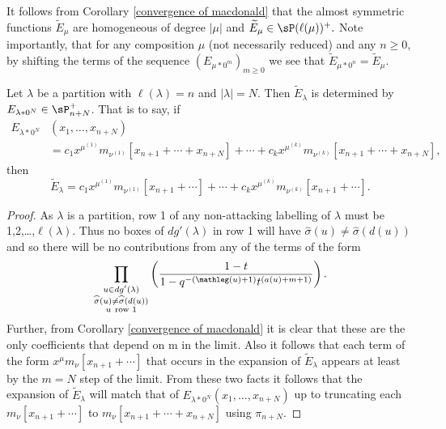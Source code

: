 It follows from Corollary \ref{convergence of macdonald} that the almost symmetric functions $\widetilde{E}_{\mu}$ are homogeneous of degree $|\mu|$ and $\widetilde{E}_{\mu} \in \sP(\ell(\mu))^{+}.$ Note importantly, that for any composition $\mu$ (not necessarily reduced) and any $n \geq 0$, by shifting the terms of the sequence $(E_{\mu*0^m})_{m\geq 0}$ we see that $\widetilde{E}_{\mu *0^n} = \widetilde{E}_{\mu}$.



\begin{coro}\label{stabilizing of convergence of macdonald for partitions}
Let $\lambda$ be a partition with $\ell(\lambda) = n$ and $|\lambda| = N$. Then $\widetilde{E}_{\lambda}$ is determined by  $E_{\lambda*0^N} \in \sP_{n+N}^{+}$. That is to say, if 
\begin{align*}
E_{\lambda*0^{N}}&(x_1,\ldots,x_{n+N}) \\ &= c_1 x^{\mu^{(1)}}m_{\nu^{(1)}}[x_{n+1}+\cdots+x_{n+N}] + \cdots + c_k x^{\mu^{(k)}}m_{\nu^{(k)}}[x_{n+1}+ \cdots +x_{n+N}],
\end{align*}
then 
$$ \widetilde{E}_{\lambda} = c_1 x^{\mu^{(1)}}m_{\nu^{(1)}}[x_{n+1}+ \cdots] + \cdots + c_k x^{\mu^{(k)}}m_{\nu^{(k)}}[x_{n+1}+ \cdots] .$$
\end{coro}

\begin{proof}
As $\lambda$ is a partition, row 1 of any non-attacking labelling of $\lambda$ must be 1,2,\ldots,$\ell(\lambda)$. Thus no boxes of $dg'(\lambda)$ in row 1 will have $\widehat{\sigma}(u) \neq \widehat{\sigma}(d(u))$ and so there will be no contributions from any of the terms of the form 
$$\prod_{\substack{ u \in dg'(\lambda) \\ \widehat{\sigma}(u) \neq \widehat{\sigma}(d(u)) \\ u ~ \text{row } 1 }} \left( \frac{1-t}{1-q^{-(\mathleg(u) +1)}t^{(a(u) + m + 1)}} \right).$$ Further, from  Corollary \ref{convergence of macdonald} it is clear that these are the only coefficients that depend on m in the limit. Also it follows that each term of the form $x^{\mu}m_{\nu}[x_{n+1}+ \cdots]$ that occurs in the expansion of $\widetilde{E}_{\lambda}$ appears at least by the $m = N$ step of the limit. From these two facts it follows that the expansion of $\widetilde{E}_{\lambda}$ will match that of $E_{\lambda*0^{N}}(x_1,\ldots,x_{n+N})$ up to truncating each $m_{\nu}[x_{n+1}+ \cdots]$ to $m_{\nu}[x_{n+1}+\cdots + x_{n+N}]$ using $\pi_{n+N}.$
\end{proof}


